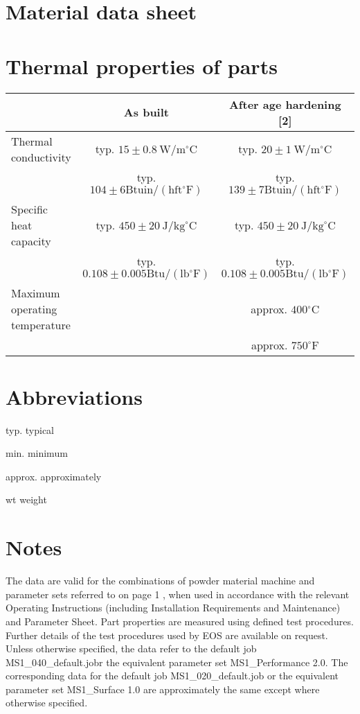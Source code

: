 \documentclass[10pt]{article}
\begin{document}
\section*{Material data sheet}
\section*{Thermal properties of parts}
\begin{center}
\begin{tabular}{lcc}
\hline
 & As built & After age hardening [2] \\
\hline
Thermal conductivity & typ. $15 \pm 0.8 \mathrm{~W} / \mathrm{m}^{\circ} \mathrm{C}$ & typ. $20 \pm 1 \mathrm{~W} / \mathrm{m}^{\circ} \mathrm{C}$ \\
 & typ. $104 \pm 6 \mathrm{Btu} \mathrm{in} /\left(\mathrm{h} \mathrm{ft}{ }^{\circ} \mathrm{F}\right)$ & typ. $139 \pm 7 \mathrm{Btu} \mathrm{in} /\left(\mathrm{h} \mathrm{ft}{ }^{\circ} \mathrm{F}\right)$ \\
\hline
Specific heat capacity & typ. $450 \pm 20 \mathrm{~J} / \mathrm{kg}^{\circ} \mathrm{C}$ & typ. $450 \pm 20 \mathrm{~J} / \mathrm{kg}^{\circ} \mathrm{C}$ \\
 & typ. $0.108 \pm 0.005 \mathrm{Btu} /\left(\mathrm{lb}{ }^{\circ} \mathrm{F}\right)$ & typ. $0.108 \pm 0.005 \mathrm{Btu} /\left(\mathrm{lb}{ }^{\circ} \mathrm{F}\right)$ \\
\hline
Maximum operating temperature &  & approx. $400{ }^{\circ} \mathrm{C}$ \\
 &  & approx. $750^{\circ} \mathrm{F}$ \\
\hline
\end{tabular}
\end{center}

\section*{Abbreviations}
typ. typical

min. minimum

approx. approximately

wt weight

\section*{Notes}
The data are valid for the combinations of powder material machine and parameter sets referred to on page 1 , when used in accordance with the relevant Operating Instructions (including Installation Requirements and Maintenance) and Parameter Sheet. Part properties are measured using defined test procedures. Further details of the test procedures used by EOS are available on request. Unless otherwise specified, the data refer to the default job MS1\_040\_default.jobr the equivalent parameter set MS1\_Performance 2.0. The corresponding data for the default job MS1\_020\_default.job or the equivalent parameter set MS1\_Surface 1.0 are approximately the same except where otherwise specified.
\end{document}
